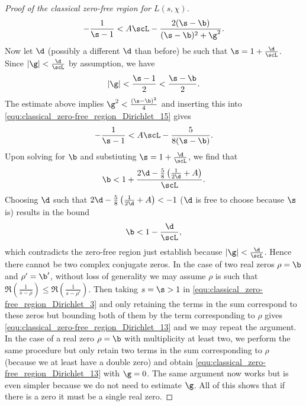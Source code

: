 \begin{proof}[Proof of the classical zero-free region for $L(s,\chi)$]
        \begin{equation}\label{equ:classical_zero-free_region_Dirichlet_15}
          -\frac{1}{\s-1} < A\scL-\frac{2(\s-\b)}{(\s-\b)^{2}+\g^{2}}.
        \end{equation}
        Now let $\d$ (possibly a different $\d$ than before) be such that $\s = 1+\frac{\d}{\scL}$. Since $|\g| < \frac{\d}{\scL}$ by assumption, we have
        \[
          |\g| < \frac{\s-1}{2} < \frac{\s-\b}{2}.
        \]
        The estimate above implies $\g^{2} < \frac{(\s-\b)^{2}}{4}$ and inserting this into \cref{equ:classical_zero-free_region_Dirichlet_15} gives
        \[
          -\frac{1}{\s-1} < A\scL-\frac{5}{8(\s-\b)}.
        \]
        Upon solving for $\b$ and substiuting $\s = 1+\frac{\d}{\scL}$, we find that
        \[
          \b < 1+\frac{2\d-\frac{5}{8}\left(\frac{1}{2\d}+A\right)}{\scL}.
        \]
        Choosing $\d$ such that $2\d-\frac{5}{8}\left(\frac{1}{2\d}+A\right) < -1$ ($\d$ is free to choose because $\s$ is) results in the bound
        \[
          \b < 1-\frac{\d}{\scL},
        \]
        which contradicts the zero-free region just establish because $|\g| < \frac{\d}{\scL}$. Hence there cannot be two complex conjugate zeros. In the case of two real zeros $\rho = \b$ and $\rho' = \b'$, without loss of generality we may assume $\rho$ is such that $\Re\left(\frac{1}{s-\rho}\right) \le \Re\left(\frac{1}{s-\rho'}\right)$. Then taking $s = \s > 1$ in \cref{equ:classical_zero-free_region_Dirichlet_3} and only retaining the terms in the sum correspond to these zeros but bounding both of them by the term corresponding to $\rho$ gives \cref{equ:classical_zero-free_region_Dirichlet_13} and we may repeat the argument. In the case of a real zero $\rho = \b$ with multiplicity at least two, we perform the same procedure but only retain two terms in the sum corresponding to $\rho$ (because we at least have a double zero) and obtain \cref{equ:classical_zero-free_region_Dirichlet_13} with $\g = 0$. The same argument now works but is even simpler because we do not need to estimate $\g$. All of this shows that if there is a zero it must be a single real zero.
      \end{proof}

